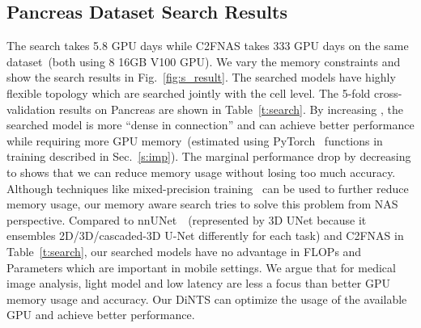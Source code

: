 \documentclass[final]{cvpr}
\begin{document}
\subsection{Pancreas Dataset Search Results}
\label{sec:search-result}
The search takes 5.8 GPU days while C2FNAS takes 333 GPU days on the same dataset~(both using 8 16GB V100 GPU). We vary the memory constraints  and show the search results in Fig.~\ref{fig:s_result}. The searched models have highly flexible topology which are searched jointly with the cell level. The 5-fold cross-validation results on Pancreas are shown in Table~\ref{t:search}. By increasing , the searched model is more ``dense in connection'' and can achieve better performance while requiring more GPU memory~(estimated using PyTorch~\cite{paszke2019pytorch} functions in training described in Sec.~\ref{s:imp}). The marginal performance drop by decreasing  to  shows that we can reduce memory usage without losing too much accuracy. Although techniques like mixed-precision training~\cite{micikevicius2017mixed} can be used to further reduce memory usage, our memory aware search tries to solve this problem from NAS perspective. Compared to nnUNet~\cite{isensee2019nnunet}~(represented by 3D UNet because it ensembles 2D/3D/cascaded-3D U-Net differently for each task) and C2FNAS in Table~\ref{t:search}, our searched models have no advantage in FLOPs and Parameters which are important in mobile settings. We argue that for medical image analysis, light model and low latency are less a focus than better GPU memory usage and accuracy. Our DiNTS can optimize the usage of the available GPU and achieve better performance.
\end{document}
